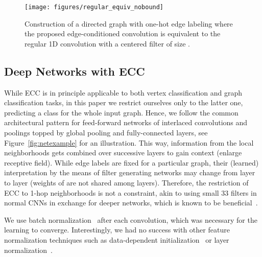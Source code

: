 \documentclass[10pt,twocolumn,letterpaper]{article}
\begin{document}
\begin{figure}[bt]
\centering
\texttt{[image: figures/regular\_equiv\_nobound]}
\vspace{1.5ex}
\caption{\label{fig:regularequiv} Construction of a directed graph with one-hot edge labeling where the proposed edge-conditioned convolution is equivalent to the regular 1D convolution with a centered filter of size .}
\end{figure}


\subsection{Deep Networks with ECC}  \label{subsec:eccnet}

While ECC is in principle applicable to both vertex classification and graph classification tasks, in this paper we restrict ourselves only to the latter one, \ie predicting a class for the whole input graph. Hence, we follow the common architectural pattern for feed-forward networks of interlaced convolutions and poolings topped by global pooling and fully-connected layers, see Figure~\ref{fig:netexample} for an illustration. This way, information from the local neighborhoods gets combined over successive layers to gain context (enlarge receptive field). While edge labels are fixed for a particular graph, their (learned) interpretation by the means of filter generating networks may change from layer to layer (weights of  are not shared among layers). Therefore, the restriction of ECC to 1-hop neighborhoods  is not a constraint, akin to using small 33 filters in normal CNNs in exchange for deeper networks, which is known to be beneficial~\cite{hesun14}.

We use batch normalization~\cite{batchnorm} after each convolution, which was necessary for the learning to converge. Interestingly, we had no success with other feature normalization techniques such as data-dependent initialization~\cite{goodinit} or layer normalization~\cite{layernorm}.
\end{document}
